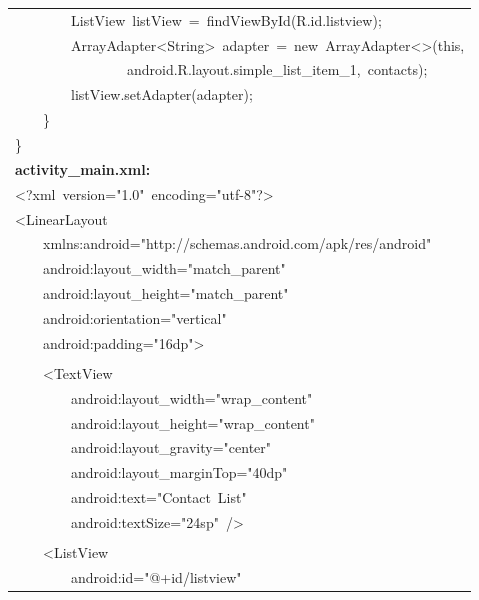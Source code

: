 \documentclass[a4paper,12pt]{article}
\begin{document}
\begin{longtable}{|p{}|}
{\ttfamily\small \ \ \ \ \ \ \ \ ListView\ listView\ =\ findViewById(R.id.listview);} \\
{\ttfamily\small \ \ \ \ \ \ \ \ ArrayAdapter\textless{}String\textgreater{}\ adapter\ =\ new\ ArrayAdapter\textless{}\textgreater{}(this,} \\
{\ttfamily\small \ \ \ \ \ \ \ \ \ \ \ \ \ \ \ \ android.R.layout.simple\_list\_item\_1,\ contacts);} \\
{\ttfamily\small \ \ \ \ \ \ \ \ listView.setAdapter(adapter);} \\
{\ttfamily\small \ \ \ \ \}} \\
{\ttfamily\small \}} \\
\hline
\rule{0pt}{13pt}\textbf{activity\_main.xml:} \\
\hline
{\ttfamily\small \textless{}?xml\ version="1.0"\ encoding="utf-8"?\textgreater{}} \\
{\ttfamily\small \textless{}LinearLayout\ } \\
{\ttfamily\small \ \ \ \ xmlns:android="http://schemas.android.com/apk/res/android"} \\
{\ttfamily\small \ \ \ \ android:layout\_width="match\_parent"} \\
{\ttfamily\small \ \ \ \ android:layout\_height="match\_parent"} \\
{\ttfamily\small \ \ \ \ android:orientation="vertical"} \\
{\ttfamily\small \ \ \ \ android:padding="16dp"\textgreater{}} \\
\strut \\
{\ttfamily\small \ \ \ \ \textless{}TextView} \\
{\ttfamily\small \ \ \ \ \ \ \ \ android:layout\_width="wrap\_content"} \\
{\ttfamily\small \ \ \ \ \ \ \ \ android:layout\_height="wrap\_content"} \\
{\ttfamily\small \ \ \ \ \ \ \ \ android:layout\_gravity="center"} \\
{\ttfamily\small \ \ \ \ \ \ \ \ android:layout\_marginTop="40dp"} \\
{\ttfamily\small \ \ \ \ \ \ \ \ android:text="Contact\ List"} \\
{\ttfamily\small \ \ \ \ \ \ \ \ android:textSize="24sp"\ /\textgreater{}} \\
\strut \\
{\ttfamily\small \ \ \ \ \textless{}ListView} \\
{\ttfamily\small \ \ \ \ \ \ \ \ android:id="@+id/listview"} \\

\end{longtable}
\end{document}
